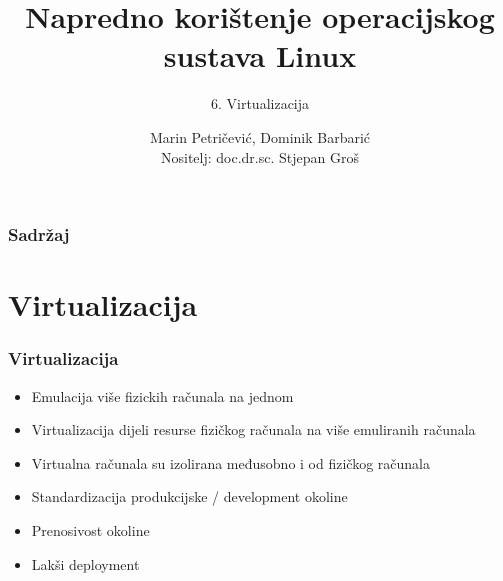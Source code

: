 \documentclass[t]{beamer}
\date{\todayiso}
\title[NKOSL]{Napredno korištenje operacijskog sustava Linux}
\author[Marin Petričević, Dominik Barbarić]{Marin Petričević, Dominik Barbarić\\{\small Nositelj: doc.dr.sc. Stjepan Groš}}
\subtitle{6. Virtualizacija}
\institute[FER]{Sveučilište u Zagrebu\\Fakultet elektrotehnike i računarstva}
\begin{document}
	{
		\begin{frame}
			\maketitle
		\end{frame}
	}

	\begin{frame}
		\frametitle{Sadržaj}
		\tableofcontents
	\end{frame}


\section{Virtualizacija}


\begin{frame}
	\frametitle{Virtualizacija}

	\begin{itemize}
    \item Emulacija više fizickih računala na jednom
		\item Virtualizacija dijeli resurse fizičkog računala na više emuliranih računala
    \item Virtualna računala su izolirana međusobno i od fizičkog računala
	\end{itemize}

	\begin{itemize}
		\item Standardizacija produkcijske / development okoline
    \item Prenosivost okoline
    \item Lakši deployment
	\end{itemize}
\end{frame}
\end{document}
